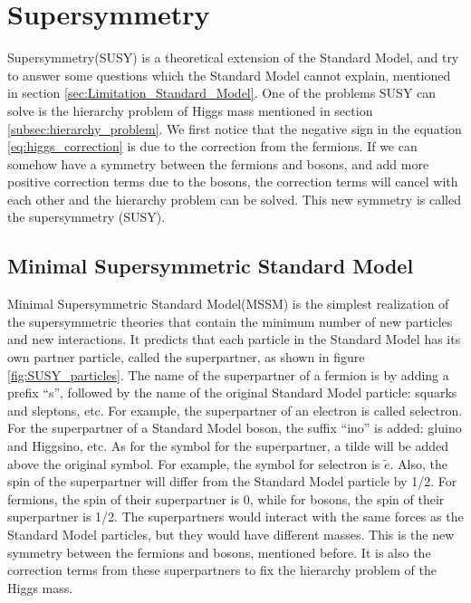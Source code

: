 \section{Supersymmetry}
Supersymmetry(SUSY) is a theoretical extension of the Standard Model, and try to answer some questions which the Standard Model cannot explain, mentioned in section \ref{sec:Limitation_Standard_Model}.
One of the problems SUSY can solve is the hierarchy problem of Higgs mass mentioned in section \ref{subsec:hierarchy_problem}.
We first notice that the negative sign in the equation \ref{eq:higgs_correction} is due to the correction from the fermions.
If we can somehow have a symmetry between the fermions and bosons, and add more positive correction terms due to the bosons, the correction terms will cancel with each other and the hierarchy problem can be solved.
This new symmetry is called the supersymmetry (SUSY).

\subsection{Minimal Supersymmetric Standard Model}
Minimal Supersymmetric Standard Model(MSSM) is the simplest realization of the supersymmetric theories that contain the minimum number of new particles and new interactions.
It predicts that each particle in the Standard Model has its own partner particle, called the superpartner, as shown in figure \ref{fig:SUSY_particles}.
The name of the superpartner of a fermion is by adding a prefix ``s'', followed by the name of the original Standard Model particle: squarks and sleptons, etc.
For example, the superpartner of an electron is called selectron.
For the superpartner of a Standard Model boson, the suffix ``ino'' is added: gluino and Higgsino, etc.
As for the symbol for the superpartner, a tilde will be added above the original symbol.
For example, the symbol for selectron is $\tilde{e}$.
Also, the spin of the superpartner will differ from the Standard Model particle by 1/2.
For fermions, the spin of their superpartner is 0, while for bosons, the spin of their superpartner is 1/2.
The superpartners would interact with the same forces as the Standard Model particles, but they would have different masses.
This is the new symmetry between the fermions and bosons, mentioned before.
It is also the correction terms from these superpartners to fix the hierarchy problem of the Higgs mass.

